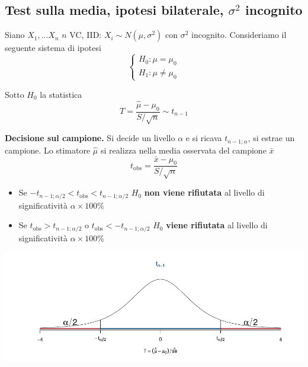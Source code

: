 \documentclass[
  11pt,
]{book}
\providecommand{\tightlist}{%
  \setlength{\itemsep}{0pt}\setlength{\parskip}{0pt}}
\theoremstyle{mytheoremstyle}
\theoremstyle{mydefstyle}
\begin{document}
\subsection{\texorpdfstring{Test sulla media, ipotesi bilaterale, \(\sigma^2\) incognito}{Test sulla media, ipotesi bilaterale, \textbackslash sigma\^{}2 incognito}}\label{test-sulla-media-ipotesi-bilaterale-sigma2-incognito}

Siano \(X_1,...X_n\) \(n\) VC, IID: \(X_i\sim N(\mu,\sigma^2)\) con \(\sigma^2\)
incognito. Consideriamo il seguente sistema di ipotesi \[\begin{cases}
H_0:\mu=\mu_0\\
H_1:\mu\neq\mu_0
\end{cases}\]

Sotto \(H_0\) la statistica
\[T=\frac{\hat \mu-\mu_0}{S/\sqrt n}\sim t_{n-1}\]

\begin{info}

\textbf{Decisione sul campione.} Si decide un livello \(\alpha\) e si ricava
\(t_{n-1;\alpha}\), si estrae un campione. Lo stimatore \(\hat\mu\) si
realizza nella media osservata del campione \(\bar x\)
\[t_{\text{obs}}=\frac{\bar x -\mu_0}{S/\sqrt n}\]

\begin{itemize}
\tightlist
\item
  Se \(-t_{n-1;\alpha/2}<t_{\text{obs}}<t_{n-1;\alpha/2}\) \(H_0\) \textbf{non
  viene rifiutata} al livello di significatività \(\alpha\times100\%\)
\item
  Se \(t_{\text{obs}}>t_{n-1;\alpha/2}\) o
  \(t_{\text{obs}}<-t_{n-1;\alpha/2}\) \(H_0\) \textbf{viene rifiutata} al
  livello di significatività \(\alpha\times100\%\)
\end{itemize}

\begin{center}\includegraphics{Appunti_di_Statistica_2025_files/figure-latex/15-test-mu-pi-24-1} \end{center}

\end{info}
\end{document}
